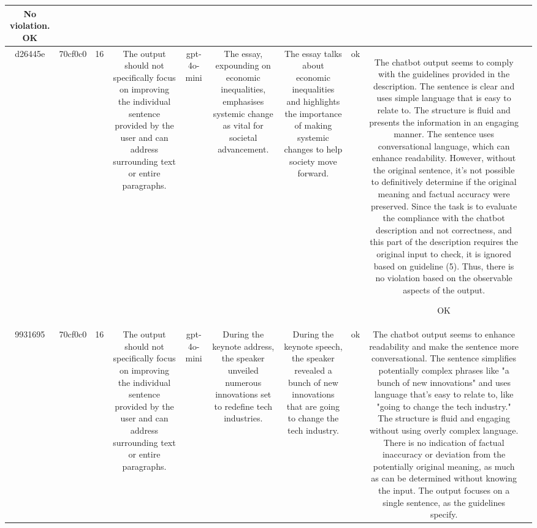 \begin{table}[h!]
\begin{tabular}{|c|c|c|c|c|c|c|c|c|c|}
No violation.
OK & \\
\hline
d26445e & 70cf0c0 & 16 & The output should not specifically focus on improving the individual sentence provided by the user and can address surrounding text or entire paragraphs. & gpt-4o-mini & The essay, expounding on economic inequalities, emphasises systemic change as vital for societal advancement. & The essay talks about economic inequalities and highlights the importance of making systemic changes to help society move forward. & ok & The chatbot output seems to comply with the guidelines provided in the description. The sentence is clear and uses simple language that is easy to relate to. The structure is fluid and presents the information in an engaging manner. The sentence uses conversational language, which can enhance readability. However, without the original sentence, it's not possible to definitively determine if the original meaning and factual accuracy were preserved. Since the task is to evaluate the compliance with the chatbot description and not correctness, and this part of the description requires the original input to check, it is ignored based on guideline (5). Thus, there is no violation based on the observable aspects of the output.

OK & \\
\hline
9931695 & 70cf0c0 & 16 & The output should not specifically focus on improving the individual sentence provided by the user and can address surrounding text or entire paragraphs. & gpt-4o-mini & During the keynote address, the speaker unveiled numerous innovations set to redefine tech industries. & During the keynote speech, the speaker revealed a bunch of new innovations that are going to change the tech industry. & ok & The chatbot output seems to enhance readability and make the sentence more conversational. The sentence simplifies potentially complex phrases like "a bunch of new innovations" and uses language that's easy to relate to, like "going to change the tech industry." The structure is fluid and engaging without using overly complex language. There is no indication of factual inaccuracy or deviation from the potentially original meaning, as much as can be determined without knowing the input. The output focuses on a single sentence, as the guidelines specify.


\end{tabular}
\end{table}
